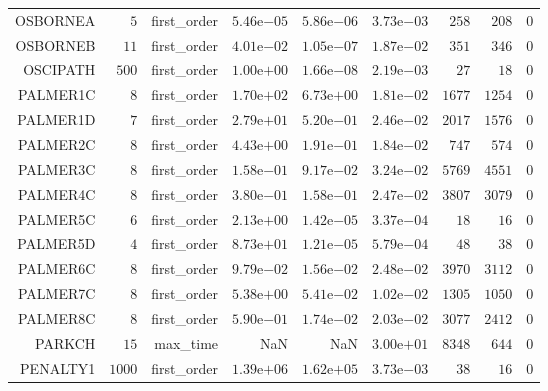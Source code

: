 \begin{longtable}{rrrrrrrrr}
OSBORNEA & \(     5\) & first\_order & \( 5.46\)e\(-05\) & \( 5.86\)e\(-06\) & \( 3.73\)e\(-03\) & \(   258\) & \(   208\) & \(     0\) \\
OSBORNEB & \(    11\) & first\_order & \( 4.01\)e\(-02\) & \( 1.05\)e\(-07\) & \( 1.87\)e\(-02\) & \(   351\) & \(   346\) & \(     0\) \\
OSCIPATH & \(   500\) & first\_order & \( 1.00\)e\(+00\) & \( 1.66\)e\(-08\) & \( 2.19\)e\(-03\) & \(    27\) & \(    18\) & \(     0\) \\
PALMER1C & \(     8\) & first\_order & \( 1.70\)e\(+02\) & \( 6.73\)e\(+00\) & \( 1.81\)e\(-02\) & \(  1677\) & \(  1254\) & \(     0\) \\
PALMER1D & \(     7\) & first\_order & \( 2.79\)e\(+01\) & \( 5.20\)e\(-01\) & \( 2.46\)e\(-02\) & \(  2017\) & \(  1576\) & \(     0\) \\
PALMER2C & \(     8\) & first\_order & \( 4.43\)e\(+00\) & \( 1.91\)e\(-01\) & \( 1.84\)e\(-02\) & \(   747\) & \(   574\) & \(     0\) \\
PALMER3C & \(     8\) & first\_order & \( 1.58\)e\(-01\) & \( 9.17\)e\(-02\) & \( 3.24\)e\(-02\) & \(  5769\) & \(  4551\) & \(     0\) \\
PALMER4C & \(     8\) & first\_order & \( 3.80\)e\(-01\) & \( 1.58\)e\(-01\) & \( 2.47\)e\(-02\) & \(  3807\) & \(  3079\) & \(     0\) \\
PALMER5C & \(     6\) & first\_order & \( 2.13\)e\(+00\) & \( 1.42\)e\(-05\) & \( 3.37\)e\(-04\) & \(    18\) & \(    16\) & \(     0\) \\
PALMER5D & \(     4\) & first\_order & \( 8.73\)e\(+01\) & \( 1.21\)e\(-05\) & \( 5.79\)e\(-04\) & \(    48\) & \(    38\) & \(     0\) \\
PALMER6C & \(     8\) & first\_order & \( 9.79\)e\(-02\) & \( 1.56\)e\(-02\) & \( 2.48\)e\(-02\) & \(  3970\) & \(  3112\) & \(     0\) \\
PALMER7C & \(     8\) & first\_order & \( 5.38\)e\(+00\) & \( 5.41\)e\(-02\) & \( 1.02\)e\(-02\) & \(  1305\) & \(  1050\) & \(     0\) \\
PALMER8C & \(     8\) & first\_order & \( 5.90\)e\(-01\) & \( 1.74\)e\(-02\) & \( 2.03\)e\(-02\) & \(  3077\) & \(  2412\) & \(     0\) \\
PARKCH & \(    15\) & max\_time &       NaN &       NaN & \( 3.00\)e\(+01\) & \(  8348\) & \(   644\) & \(     0\) \\
PENALTY1 & \(  1000\) & first\_order & \( 1.39\)e\(+06\) & \( 1.62\)e\(+05\) & \( 3.73\)e\(-03\) & \(    38\) & \(    16\) & \(     0\) \\

\end{longtable}
